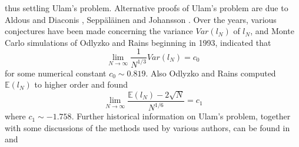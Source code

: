 \documentclass{amsart}
\theoremstyle{definition}
\theoremstyle{remark}
\numberwithin{equation}{section}
\newcommand{\E}{\mathbb E}
\begin{document}
thus settling Ulam's problem.
Alternative proofs of Ulam's problem are due to Aldous and Diaconis 
\cite{AD}, Sepp\"al\"ainen \cite{Se} and Johansson \cite{Johan}.
Over the years, various conjectures have been made concerning 
the variance $Var(l_N)$ of $l_N$, and Monte Carlo simulations of 
Odlyzko and Rains beginning in 1993, indicated that 
\begin{equation}\label{e-c0}
   \lim_{N\to\infty} \frac1{N^{1/3}} Var(l_N) = c_0
\end{equation}
for some numerical constant $c_0 \sim 0.819$. 
Also Odlyzko and Rains computed $\E(l_N)$ to higher order 
and found 
\begin{equation}\label{e-c1}
   \lim_{N\to\infty} \frac{\E(l_N)-2\sqrt{N}}{N^{1/6}} =c_1
\end{equation}
where $c_1 \sim -1.758$.
Further historical information on Ulam's problem, together with some 
discussions of the methods used by various authors, can be found 
in \cite{AD} and \cite{OR}
\end{document}
